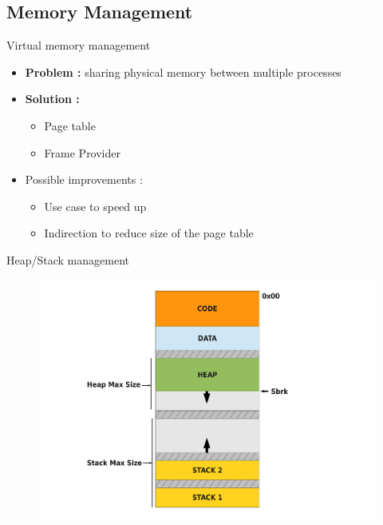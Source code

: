 \documentclass{beamer}
\begin{document}
\subsection{Memory Management}
\begin{frame}{Virtual memory management}
    \begin{itemize}
        \item \textbf{Problem :} sharing physical memory between multiple
            processes
        \item \textbf{Solution :}
            \begin{itemize}
                \item Page table
                \item Frame Provider
            \end{itemize}
        \item Possible improvements :
            \begin{itemize}
                \item Use case to speed up
                \item Indirection to reduce size of the page table
            \end{itemize}
    \end{itemize}
\end{frame}

\begin{frame}{Heap/Stack management}
    \begin{figure}[ht]
        \includegraphics[width=1\linewidth]{memoryschema.pdf}
    \end{figure}
\end{frame}
\end{document}
